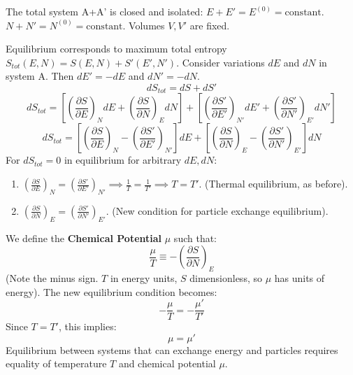 \documentclass[11pt]{article}
\newcommand{\pderiv}[2]{\frac{\partial #1}{\partial #2}}
\begin{document}
The total system A+A' is closed and isolated:
$E + E' = E^{(0)} = \text{constant}$.
$N + N' = N^{(0)} = \text{constant}$.
Volumes $V, V'$ are fixed.

Equilibrium corresponds to maximum total entropy $S_{tot}(E, N) = S(E, N) + S'(E', N')$.
Consider variations $dE$ and $dN$ in system A. Then $dE'=-dE$ and $dN'=-dN$.
\[ dS_{tot} = dS + dS' \]
\[ dS_{tot} = \left[ \left(\pderiv{S}{E}\right)_N dE + \left(\pderiv{S}{N}\right)_E dN \right] + \left[ \left(\pderiv{S'}{E'}\right)_{N'} dE' + \left(\pderiv{S'}{N'}\right)_{E'} dN' \right] \]
\[ dS_{tot} = \left[ \left(\pderiv{S}{E}\right)_N - \left(\pderiv{S'}{E'}\right)_{N'} \right] dE + \left[ \left(\pderiv{S}{N}\right)_E - \left(\pderiv{S'}{N'}\right)_{E'} \right] dN \]
For $dS_{tot}=0$ in equilibrium for arbitrary $dE, dN$:
\begin{enumerate}
    \item $\left(\pderiv{S}{E}\right)_N = \left(\pderiv{S'}{E'}\right)_{N'} \implies \frac{1}{T} = \frac{1}{T'} \implies T=T'$. (Thermal equilibrium, as before).
    \item $\left(\pderiv{S}{N}\right)_E = \left(\pderiv{S'}{N'}\right)_{E'}$. (New condition for particle exchange equilibrium).
\end{enumerate}
We define the \textbf{Chemical Potential} $\mu$ such that:
\[ \frac{\mu}{T} \equiv - \left( \pderiv{S}{N} \right)_E \]
(Note the minus sign. $T$ in energy units, $S$ dimensionless, so $\mu$ has units of energy).
The new equilibrium condition becomes:
\[ -\frac{\mu}{T} = -\frac{\mu'}{T'} \]
Since $T=T'$, this implies:
\[ \mu = \mu' \]
Equilibrium between systems that can exchange energy and particles requires equality of temperature $T$ and chemical potential $\mu$.
\end{document}
